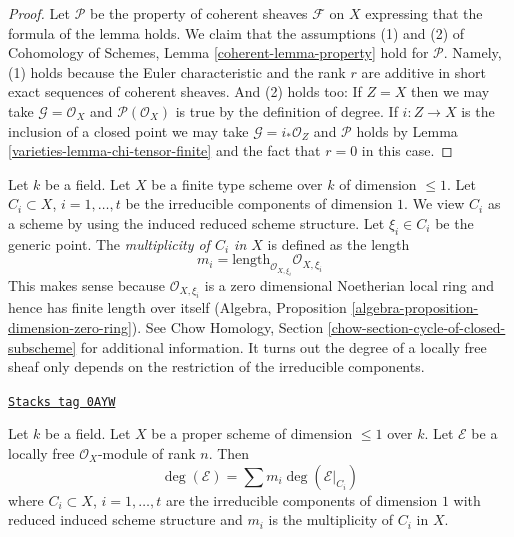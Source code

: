 \begin{proof}

Let $\mathcal{P}$ be the property of coherent sheaves $\mathcal{F}$
on $X$ expressing that the formula of the lemma holds. We claim that
the assumptions (1) and (2) of
Cohomology of Schemes, Lemma \ref{coherent-lemma-property}
hold for $\mathcal{P}$. Namely, (1) holds because the Euler characteristic
and the rank $r$ are additive in short exact sequences of coherent sheaves.
And (2) holds too: If $Z = X$ then we may take
$\mathcal{G} = \mathcal{O}_X$ and $\mathcal{P}(\mathcal{O}_X)$
is true by the definition of degree. If $i : Z \to X$ is the inclusion
of a closed point we may take $\mathcal{G} = i_*\mathcal{O}_Z$
and $\mathcal{P}$ holds by Lemma \ref{varieties-lemma-chi-tensor-finite}
and the fact that $r = 0$ in this case.
\end{proof}

Let $k$ be a field. Let $X$ be a finite type scheme over $k$ of
dimension $\leq 1$. Let $C_i \subset X$, $i = 1, \ldots, t$ be
the irreducible components of dimension $1$. We view $C_i$ as a scheme
by using the induced reduced scheme structure. Let $\xi_i \in C_i$ be the
generic point. The {\it multiplicity of $C_i$ in $X$} is defined
as the length
$$
m_i = \text{length}_{\mathcal{O}_{X, \xi_i}} \mathcal{O}_{X, \xi_i}
$$
This makes sense because $\mathcal{O}_{X, \xi_i}$ is a zero dimensional
Noetherian local ring and hence has finite length over itself
(Algebra, Proposition \ref{algebra-proposition-dimension-zero-ring}).
See Chow Homology, Section \ref{chow-section-cycle-of-closed-subscheme}
for additional information. It turns out the degree of a locally free
sheaf only depends on the restriction of the irreducible components.

\begin{lemma}
\label{varieties-lemma-degree-in-terms-of-components}
\href{https://stacks.math.columbia.edu/tag/0AYW}{\texttt{Stacks tag 0AYW}}

Let $k$ be a field. Let $X$ be a proper scheme of dimension $\leq 1$ over $k$.
Let $\mathcal{E}$ be a locally free $\mathcal{O}_X$-module of rank $n$.
Then
$$
\deg(\mathcal{E}) = \sum m_i \deg(\mathcal{E}|_{C_i})
$$
where $C_i \subset X$, $i = 1, \ldots, t$ are the irreducible components
of dimension $1$ with reduced induced scheme structure and $m_i$ is the
multiplicity of $C_i$ in $X$.
\end{lemma}

